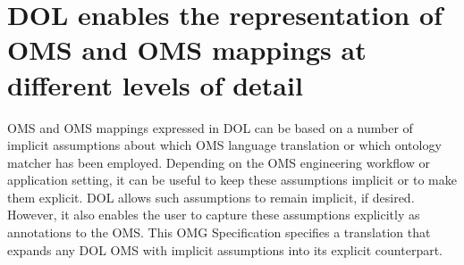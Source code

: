 \documentclass[10pt,%
\ifpretendfinal
final%
\else
draft%
\fi,
]{scrreprt}
\newcommand*{\IS}{OMG Specification\xspace}
\begin{document}
\section{DOL enables the representation of OMS and OMS mappings at different levels of detail}\label{c:explicit}

OMS and OMS mappings expressed in DOL can be based on a
number of implicit assumptions about which OMS language
translation or which ontology matcher has been employed.  Depending on
the OMS engineering workflow or application setting, it can be
useful to keep these assumptions implicit or to make them explicit.
DOL allows such assumptions to remain implicit, if desired.
However, it also enables the user to 
capture these assumptions explicitly as annotations
to the OMS.  This \IS specifies a
translation that expands any DOL OMS with implicit assumptions
into its explicit counterpart.
\end{document}

